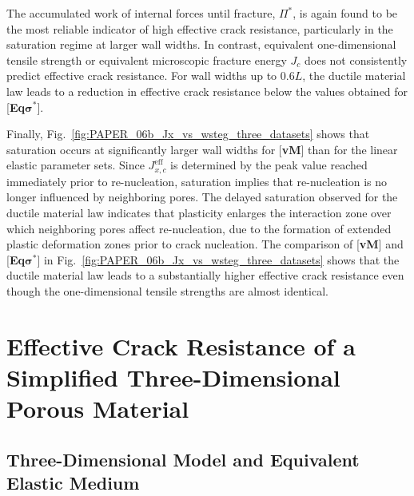 \documentclass[pdflatex,sn-mathphys-num]{sn-jnl}%
\newcommand{\vMLabel}{[\textbf{vM}]\xspace}
\newcommand{\EqSigmaStarLabel}{[\textbf{Eq$\boldsymbol{\sigma^*}$}]\xspace}
\theoremstyle{thmstyleone}%
\theoremstyle{thmstyletwo}%
\theoremstyle{thmstylethree}%
\begin{document}
The accumulated work of internal forces until fracture, $\Pi^*$, is again found to be the most reliable indicator of high effective crack resistance, particularly in the saturation regime at larger wall widths. In contrast, equivalent one-dimensional tensile strength or equivalent microscopic fracture energy $J_c$ does not consistently predict effective crack resistance. For wall widths up to $0.6L$, the ductile material law leads to a reduction in effective crack resistance below the values obtained for \EqSigmaStarLabel.

Finally, Fig.~\ref{fig:PAPER_06b_Jx_vs_wsteg_three_datasets} shows that saturation occurs at significantly larger wall widths for \vMLabel than for the linear elastic parameter sets. Since $J_{x,c}^{\text{eff}}$ is determined by the peak value reached immediately prior to re-nucleation, saturation implies that re-nucleation is no longer influenced by neighboring pores. The delayed saturation observed for the ductile material law indicates that plasticity enlarges the interaction zone over which neighboring pores affect re-nucleation, due to the formation of extended plastic deformation zones prior to crack nucleation.
The comparison of \vMLabel and \EqSigmaStarLabel in Fig.~\ref{fig:PAPER_06b_Jx_vs_wsteg_three_datasets} shows that the ductile material law leads to a substantially higher effective crack resistance even though the one-dimensional tensile strengths are almost identical.

 




\section{Effective Crack Resistance of a Simplified Three-Dimensional Porous Material}
\label{sec:3D_results}

\subsection{Three-Dimensional Model and Equivalent Elastic Medium}
\label{sec:3D_effective_medium}
\end{document}
